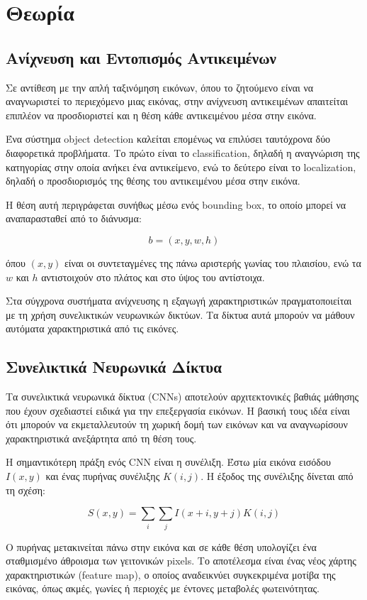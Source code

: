 \documentclass[12pt]{article}
\begin{document}
\section{Θεωρία}

\subsection{Ανίχνευση και Εντοπισμός Αντικειμένων}
Σε αντίθεση με την απλή ταξινόμηση εικόνων, όπου το ζητούμενο είναι να αναγνωριστεί το περιεχόμενο μιας εικόνας, στην ανίχνευση αντικειμένων απαιτείται 
επιπλέον να προσδιοριστεί και η θέση κάθε αντικειμένου μέσα στην εικόνα.

Ένα σύστημα object detection καλείται επομένως να επιλύσει ταυτόχρονα δύο διαφορετικά προβλήματα. Το πρώτο είναι το classification, δηλαδή η αναγνώριση 
της κατηγορίας στην οποία ανήκει ένα αντικείμενο, ενώ το δεύτερο είναι το localization, δηλαδή ο προσδιορισμός της θέσης του αντικειμένου μέσα στην 
εικόνα.

Η θέση αυτή περιγράφεται συνήθως μέσω ενός bounding box, το οποίο μπορεί να αναπαρασταθεί από το διάνυσμα:

\[
b=(x,y,w,h)
\]

όπου $(x,y)$ είναι οι συντεταγμένες της πάνω αριστερής γωνίας του πλαισίου, ενώ τα $w$ και $h$ αντιστοιχούν στο πλάτος και στο ύψος του αντίστοιχα.

Στα σύγχρονα συστήματα ανίχνευσης η εξαγωγή χαρακτηριστικών πραγματοποιείται με τη χρήση συνελικτικών νευρωνικών δικτύων. Τα δίκτυα αυτά μπορούν 
να μάθουν αυτόματα χαρακτηριστικά από τις εικόνες.

\subsection{Συνελικτικά Νευρωνικά Δίκτυα}

Τα συνελικτικά νευρωνικά δίκτυα (CNNs) αποτελούν αρχιτεκτονικές βαθιάς μάθησης που έχουν σχεδιαστεί ειδικά για την επεξεργασία εικόνων. Η βασική τους 
ιδέα είναι ότι μπορούν να εκμεταλλευτούν τη χωρική δομή των εικόνων και να αναγνωρίσουν χαρακτηριστικά ανεξάρτητα από τη θέση τους.

Η σημαντικότερη πράξη ενός CNN είναι η συνέλιξη. Έστω μία εικόνα εισόδου $I(x,y)$ και ένας πυρήνας συνέλιξης $K(i,j)$. Η έξοδος της συνέλιξης δίνεται 
από τη σχέση:

\[
S(x,y)=
\sum_i \sum_j
I(x+i,y+j)K(i,j)
\]

Ο πυρήνας μετακινείται πάνω στην εικόνα και σε κάθε θέση υπολογίζει ένα σταθμισμένο άθροισμα των γειτονικών pixels. Το αποτέλεσμα είναι ένας νέος 
χάρτης χαρακτηριστικών (feature map), ο οποίος αναδεικνύει συγκεκριμένα μοτίβα της εικόνας, όπως ακμές, γωνίες ή περιοχές με έντονες μεταβολές 
φωτεινότητας.
\end{document}
